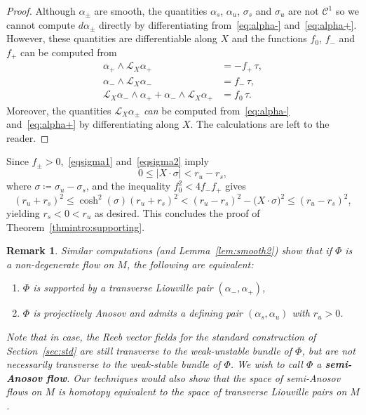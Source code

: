 \documentclass[letterpaper, 11pt]{article}
\numberwithin{equation}{section}
\newtheorem{rem}[thm]{Remark}
\begin{document}
\begin{proof} Although $\alpha_\pm$ are smooth, the quantities $\alpha_s$, $\alpha_u$, $\sigma_s$ and $\sigma_u$ are not $\mathcal{C}^1$ so we cannot compute $d\alpha_\pm$ directly by differentiating from~\eqref{eq:alpha-} and~\eqref{eq:alpha+}. However, these quantities are differentiable along $X$ and the functions $f_0$, $f_-$ and $f_+$ can be computed from 
\begin{align*}
\alpha_+ \wedge \mathcal{L}_X \alpha_+ &= - f_+ \, \tau,\\
\alpha_- \wedge \mathcal{L}_X \alpha_- &= f_- \, \tau, \\
\mathcal{L}_X \alpha_- \wedge \alpha_+ + \alpha_- \wedge \mathcal{L}_X \alpha_+ &= f_0 \, \tau.
\end{align*}
Moreover, the quantities $\mathcal{L}_X \alpha_\pm$ \emph{can} be computed from~\eqref{eq:alpha-} and~\eqref{eq:alpha+} by differentiating along $X$. The calculations are left to the reader.
\end{proof}

Since $f_\pm >0$,~\eqref{eqsigma1} and~\eqref{eqsigma2} imply $$0 \leq \vert X\cdot \sigma \vert < r_u - r_s,$$
where $\sigma \coloneqq \sigma_u - \sigma_s$, and the inequality $f_0^2 < 4f_- f_+$ gives
$$(r_u+r_s)^2 \leq \cosh^2(\sigma)(r_u+r_s)^2 < (r_u - r_s)^2 - \big(X \cdot \sigma \big)^2 \leq (r_u-r_s)^2,$$
yielding $r_s < 0 < r_u$ as desired. This concludes the proof of Theorem~\ref{thmintro:supporting}.

\begin{rem} \label{rem:transversepair}
Similar computations (and Lemma~\ref{lem:smooth2}) show that if $\Phi$ is a non-degenerate flow on $M$, the following are equivalent:
\begin{enumerate}[label=(\arabic*)]
\item $\Phi$ is supported by a transverse Liouville pair $(\alpha_-, \alpha_+)$,
\item $\Phi$ is projectively Anosov and admits a defining pair $(\alpha_s, \alpha_u)$ with $r_u > 0$.
\end{enumerate}
Note that in case, the Reeb vector fields for the standard construction of Section~\ref{sec:std} are still transverse to the weak-unstable bundle of $\Phi$, but are not necessarily transverse to the weak-stable bundle of $\Phi$. We wish to call $\Phi$ a \textbf{semi-Anosov flow}. Our techniques would also show that the space of semi-Anosov flows on $M$ is homotopy equivalent to the space of transverse Liouville pairs on $M$.
\end{rem}
\end{document}

